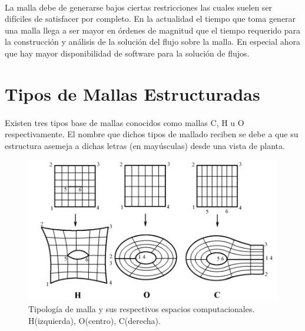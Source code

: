 \documentclass[letterpaper, openright, 12pt]{book}
\begin{document}
    \paragraph*{}
        La malla debe de generarse bajos ciertas restricciones las cuales suelen
        ser difíciles de satisfacer por completo. En la actualidad el tiempo que
        toma generar una malla llega a ser mayor en órdenes de magnitud que el
        tiempo requerido para la construcción y análisis de la solución del
        flujo sobre la malla. En especial ahora que hay mayor disponibilidad de
        software para la solución de flujos.\cite{thompsonhandbook}

\section{Tipos de Mallas Estructuradas}
    \paragraph*{}
        Existen tres tipos base de mallas conocidos como mallas C, H u O
        respectivamente. El nombre que dichos tipos de mallado reciben se debe
        a que su estructura asemeja a dichas letras (en mayúsculas) desde una
        vista de planta.

        \begin{figure}[htbp!]
            \centering
            \includegraphics[keepaspectratio, width=170mm]{./Imagenes/tipos-de-malla}
            \captionsetup{justification=centering, margin=2cm}
            \caption[Tipología de mallas]{Tipología de malla y sus respectivos espacios computacionales. H(izquierda), O(centro), C(derecha).\cite{vladimir-grid}}
            \label{fig:tipos-de-malla}
        \end{figure}
\end{document}
